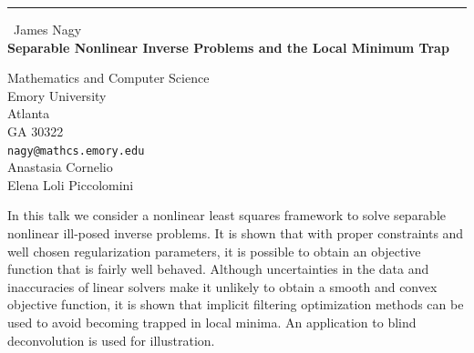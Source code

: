 \documentclass{report}
\begin{document}
\begin{center}
\rule{6in}{1pt} \
{\large James Nagy \\
{\bf Separable Nonlinear Inverse Problems and the Local Minimum Trap}}

Mathematics and Computer Science \\ Emory University \\ Atlanta \\ GA 30322
\\
{\tt nagy@mathcs.emory.edu}\\
Anastasia Cornelio\\
Elena Loli Piccolomini\end{center}

In this talk we consider a nonlinear least squares framework to solve
separable nonlinear ill-posed inverse problems. It is shown that with
proper constraints and well chosen regularization parameters, it is
possible to obtain an objective function that is fairly well behaved.
Although uncertainties in the data and inaccuracies of linear solvers
make it unlikely to obtain a smooth and convex objective function, it
is shown that implicit filtering optimization methods can be used to
avoid becoming trapped in local minima. An application to blind
deconvolution is used for illustration.
\end{document}
